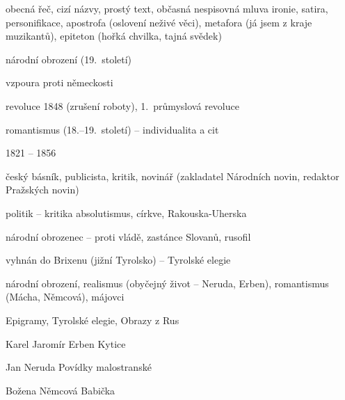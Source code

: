 {\newpart

obecná řeč, cizí názvy, prostý text, občasná nespisovná mluva
ironie, satira, personifikace, apostrofa (oslovení neživé věci), metafora (já
jsem z kraje muzikantů), epiteton (hořká chvilka, tajná svědek)

\begin{compactitem}
	\item národní obrození (19.~století)
	\item vzpoura proti německosti
	\item revoluce 1848 (zrušení roboty), 1.~průmyslová revoluce
	\item romantismus (18.--19.~století) -- individualita a cit
\end{compactitem}

\parag{\getauthor}
\begin{compactitem}
\item 1821 -- 1856
\item český básník, publicista, kritik, novinář (zakladatel Národních novin,
	redaktor Pražských novin)
\item politik -- kritika absolutismus, církve, Rakouska-Uherska
\item národní obrozenec -- proti vládě, zastánce Slovanů, rusofil
\item vyhnán do Brixenu (jižní Tyrolsko) -- Tyrolské elegie
\item národní obrození, realismus (obyčejný život -- Neruda, Erben),
	romantismus (Mácha, Němcová), májovci
\item Epigramy, Tyrolské elegie, Obrazy z Rus
\end{compactitem}

\begin{compactdesc}
	\item[Karel Jaromír Erben] Kytice
	\item[Jan Neruda] Povídky malostranské
	\item[Božena Němcová] Babička
\end{compactdesc}
}
